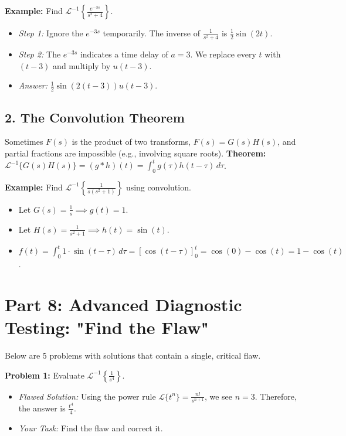 \documentclass[11pt, a4paper]{article}
\theoremstyle{definition}
\theoremstyle{remark}
\newcommand{\Laplace}{\mathcal{L}}
\newcommand{\InvLaplace}{\mathcal{L}^{-1}}
\begin{document}
\textbf{Example:} Find $\InvLaplace\left\{ \frac{e^{-3s}}{s^2 + 4} \right\}$.
\begin{itemize}
    \item \textit{Step 1:} Ignore the $e^{-3s}$ temporarily. The inverse of $\frac{1}{s^2+4}$ is $\frac{1}{2}\sin(2t)$.
    \item \textit{Step 2:} The $e^{-3s}$ indicates a time delay of $a=3$. We replace every $t$ with $(t-3)$ and multiply by $u(t-3)$.
    \item \textit{Answer:} $\frac{1}{2}\sin(2(t-3))u(t-3)$.
\end{itemize}

\subsection{2. The Convolution Theorem}
Sometimes $F(s)$ is the product of two transforms, $F(s) = G(s)H(s)$, and partial fractions are impossible (e.g., involving square roots). 
\textbf{Theorem:} $\InvLaplace\{G(s)H(s)\} = (g * h)(t) = \int_0^t g(\tau)h(t-\tau) \, d\tau$.

\textbf{Example:} Find $\InvLaplace\left\{ \frac{1}{s(s^2+1)} \right\}$ using convolution.
\begin{itemize}
    \item Let $G(s) = \frac{1}{s} \implies g(t) = 1$.
    \item Let $H(s) = \frac{1}{s^2+1} \implies h(t) = \sin(t)$.
    \item $f(t) = \int_0^t 1 \cdot \sin(t-\tau) \, d\tau = \left[ \cos(t-\tau) \right]_0^t = \cos(0) - \cos(t) = 1 - \cos(t)$.
\end{itemize}

\section{Part 8: Advanced Diagnostic Testing: "Find the Flaw"}

Below are 5 problems with solutions that contain a single, critical flaw. 

\textbf{Problem 1:} Evaluate $\InvLaplace\left\{ \frac{1}{s^4} \right\}$.
\begin{itemize}
    \item \textit{Flawed Solution:} Using the power rule $\Laplace\{t^n\} = \frac{n!}{s^{n+1}}$, we see $n=3$. Therefore, the answer is $\frac{t^4}{4}$.
    \item \textit{Your Task:} Find the flaw and correct it.
\end{itemize}
\end{document}
